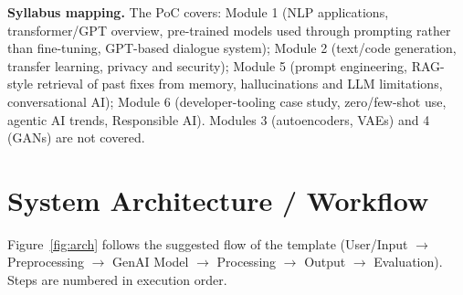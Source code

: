 \documentclass[11pt,letterpaper]{article}
\begin{document}
\medskip
\textbf{Syllabus mapping.} The PoC covers: Module 1 (NLP applications, transformer/GPT overview, pre-trained models used through prompting rather than fine-tuning, GPT-based dialogue system); Module 2 (text/code generation, transfer learning, privacy and security); Module 5 (prompt engineering, RAG-style retrieval of past fixes from memory, hallucinations and LLM limitations, conversational AI); Module 6 (developer-tooling case study, zero/few-shot use, agentic AI trends, Responsible AI). Modules 3 (autoencoders, VAEs) and 4 (GANs) are not covered.

\section{System Architecture / Workflow}

Figure~\ref{fig:arch} follows the suggested flow of the template (User/Input $\rightarrow$ Preprocessing $\rightarrow$ GenAI Model $\rightarrow$ Processing $\rightarrow$ Output $\rightarrow$ Evaluation). Steps are numbered in execution order.
\end{document}
